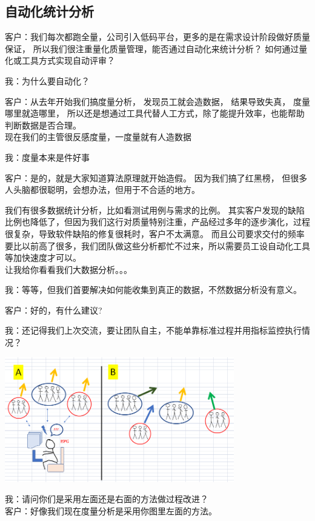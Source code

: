 \hypertarget{ux81eaux52a8ux5316ux7edfux8ba1ux5206ux6790}{%
\subsection{自动化统计分析}\label{ux81eaux52a8ux5316ux7edfux8ba1ux5206ux6790}}

客户：我们每次都跑全量，公司引入低码平台，更多的是在需求设计阶段做好质量保证，
所以我们很注重量化质量管理，能否通过自动化来统计分析？
如何通过量化或工具方式实现自动评审？

我：为什么要自动化？

客户：从去年开始我们搞度量分析， 发现员工就会造数据， 结果导致失真，
度量哪里就造哪里，
所以还是想通过工具代替人工方式，除了能提升效率，也能帮助判断数据是否合理。\\
现在我们的主管很反感度量，一度量就有人造数据

我：度量本来是件好事

客户：是的，就是大家知道算法原理就开始造假。 因为我们搞了红黑榜，
但很多人头脑都很聪明，会想办法，但用于不合适的地方。

我们有很多数据统计分析，比如看测试用例与需求的比例。
其实客户发现的缺陷比例也降低了，但因为我们这行对质量特别注重，产品经过多年的逐步演化，过程很复杂，导致软件缺陷的修复很耗时，客户不太满意。
而且公司要求交付的频率要比以前高了很多，我们团队做这些分析都忙不过来，所以需要员工设自动化工具等加快速度才可以。\\
让我给你看看我们大数据分析。。。

我：等等，但我们首要解决如何能收集到真正的数据，不然数据分析没有意义。

客户：好的，有什么建议?

我：还记得我们上次交流，要让团队自主，不能单靠标准过程并用指标监控执行情况？


\includegraphics[width=10cm]{Diagram20.png}

我：请问你们是采用左面还是右面的方法做过程改进？\\
客户：好像我们现在度量分析是采用你图里左面的方法。

